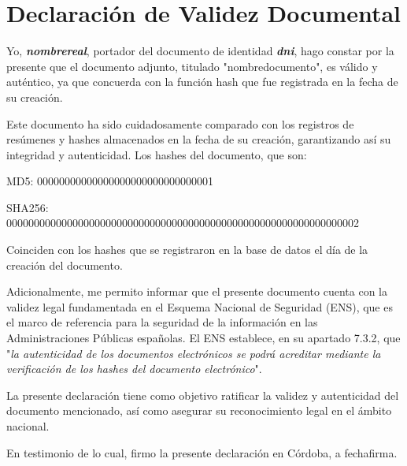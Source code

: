 \documentclass[
]{article}
\author{}
\date{}
\begin{document}
\hypertarget{declaraciuxf3n-de-validez-documental}{%
\section{\texorpdfstring{\textbf{Declaración de Validez
Documental}}{Declaración de Validez Documental}}\label{declaraciuxf3n-de-validez-documental}}

Yo, \emph{\textbf{nombrereal}}, portador del documento de
identidad \emph{\textbf{dni}}, hago constar por la presente que
el documento adjunto, titulado "nombredocumento", es válido y auténtico,
ya que concuerda con la función hash que fue registrada en la fecha de
su creación.

Este documento ha sido cuidadosamente comparado con los registros de
resúmenes y hashes almacenados en la fecha de su creación, garantizando
así su integridad y autenticidad. Los hashes del documento, que son:

MD5: 00000000000000000000000000000001

SHA256: 0000000000000000000000000000000000000000000000000000000000000002

Coinciden con los hashes que se registraron en la base de datos el día
de la creación del documento.

Adicionalmente, me permito informar que el presente documento cuenta con
la validez legal fundamentada en el Esquema Nacional de Seguridad (ENS),
que es el marco de referencia para la seguridad de la información en las
Administraciones Públicas españolas. El ENS establece, en su apartado
7.3.2, que "\emph{la autenticidad de los documentos electrónicos se
podrá acreditar mediante la verificación de los hashes del documento
electrónico}".

La presente declaración tiene como objetivo ratificar la validez y
autenticidad del documento mencionado, así como asegurar su
reconocimiento legal en el ámbito nacional.

En testimonio de lo cual, firmo la presente declaración en Córdoba, a
fechafirma.
\end{document}
